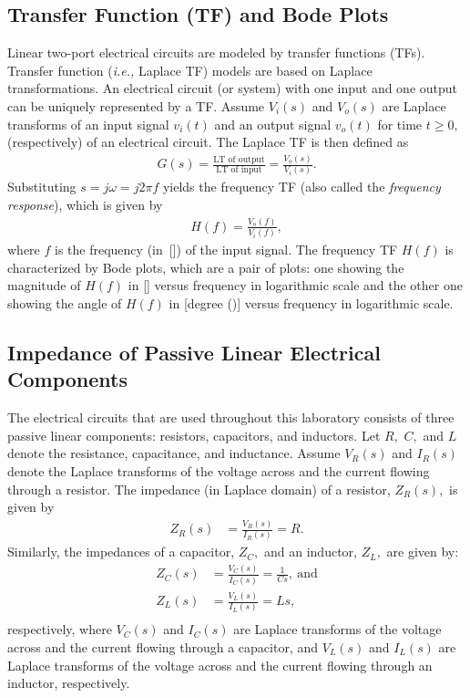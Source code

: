   \subsection{Transfer Function (TF) and Bode Plots}
\label{sec:transferFunction}
Linear two-port electrical circuits are modeled by transfer functions (TFs). Transfer function (\textit{i.e.,} Laplace TF) models are based on Laplace transformations. An electrical circuit (or system) with one input and one output can be uniquely represented by a TF.   Assume $V_i(s)$ and $V_o(s)$ are Laplace transforms of an input signal $v_i(t)$ and an output signal $v_o(t)$ for time $t\ge 0,$ (respectively) of an electrical circuit. The Laplace TF is then defined as %
  \begin{align}
    G(s) = \frac{\text{LT of output}}{\text{LT of input}}=\frac{V_o(s)}{V_i(s)}.
    \label{eq:LaplaceTF}
  \end{align}
Substituting $s=j\omega = j2\pi f$ yields the frequency TF (also called the \emph{frequency response}), which is given by %
\begin{align}
    H(f) = \frac{V_o(f)}{V_i(f)},
\end{align}
where $f$ is the frequency (in~[\hertz]) of the input signal. The frequency TF $H(f)$ is characterized by Bode plots, which are a pair of plots: one showing the magnitude of $H(f)$ in [\decibel] versus frequency in logarithmic scale  and the other one showing the angle of $H(f)$ in [degree (\degree)] versus frequency in logarithmic scale. 

\subsection{Impedance of Passive Linear Electrical Components}
\label{sec:TF-Passive}
The electrical circuits that are used throughout this laboratory consists of three passive linear components: resistors, capacitors, and inductors. Let $R,$ $C,$ and $L$ denote the resistance, capacitance, and inductance. Assume $V_R(s)$ and $I_R(s)$ denote  the Laplace transforms of the voltage across and the current flowing through a resistor. The impedance (in Laplace domain) of a resistor, $Z_R(s),$ is  given by %
%
\begin{align*}
  Z_R(s) &= \frac{V_R(s)}{I_R(s)}  = R.
\end{align*}
%
Similarly, the impedances of a capacitor, $Z_C,$ and an inductor, $Z_L,$ are given by: %
%
\begin{align*}
  Z_C(s) &= \frac{V_C(s)}{I_C(s)}  = \frac{1}{Cs},~\text{and}\\
  Z_L(s) &= \frac{V_L(s)}{I_L(s)}  = Ls,\\  
\end{align*}
%
respectively, where $V_C(s)$ and $I_C(s)$ are Laplace transforms of the voltage across and the current flowing through a capacitor, and $V_L(s)$ and $I_L(s)$ are Laplace transforms of the  voltage across and the current flowing through an inductor, respectively. 

